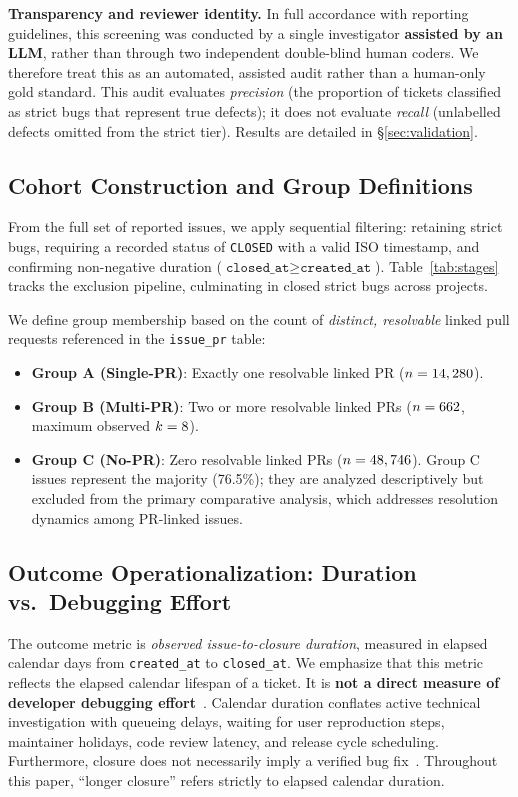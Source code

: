 \textbf{Transparency and reviewer identity.} In full accordance with reporting guidelines, this screening was conducted by a single investigator \textbf{assisted by an LLM}, rather than through two independent double-blind human coders. We therefore treat this as an automated, assisted audit rather than a human-only gold standard. This audit evaluates \emph{precision} (the proportion of tickets classified as strict bugs that represent true defects); it does not evaluate \emph{recall} (unlabelled defects omitted from the strict tier). Results are detailed in \S\ref{sec:validation}.

\subsection{Cohort Construction and Group Definitions}\label{sec:cohort}
From the full set of \valSzero{} reported issues, we apply sequential filtering: retaining strict bugs, requiring a recorded status of \texttt{CLOSED} with a valid ISO timestamp, and confirming non-negative duration ($\texttt{closed\_at} \ge \texttt{created\_at}$). Table~\ref{tab:stages} tracks the exclusion pipeline, culminating in \valSfour{} closed strict bugs across \valnProjCohort{} projects.



We define group membership based on the count of \emph{distinct, resolvable} linked pull requests referenced in the \texttt{issue\_pr} table:
\begin{itemize}
  \item \textbf{Group A (Single-PR)}: Exactly one resolvable linked PR ($n=14,280$).
  \item \textbf{Group B (Multi-PR)}: Two or more resolvable linked PRs ($n=662$, maximum observed $k=8$).
  \item \textbf{Group C (No-PR)}: Zero resolvable linked PRs ($n=48,746$). Group C issues represent the majority (76.5\%); they are analyzed descriptively but excluded from the primary comparative analysis, which addresses resolution dynamics among PR-linked issues.
\end{itemize}

\subsection{Outcome Operationalization: Duration vs.\ Debugging Effort}\label{sec:outcome}
The outcome metric is \emph{observed issue-to-closure duration}, measured in elapsed calendar days from \texttt{created\_at} to \texttt{closed\_at}. We emphasize that this metric reflects the elapsed calendar lifespan of a ticket. It is \textbf{not a direct measure of developer debugging effort}~\cite{mockus2002two}. Calendar duration conflates active technical investigation with queueing delays, waiting for user reproduction steps, maintainer holidays, code review latency, and release cycle scheduling. Furthermore, closure does not necessarily imply a verified bug fix~\cite{herzig2013not}. Throughout this paper, ``longer closure'' refers strictly to elapsed calendar duration.

